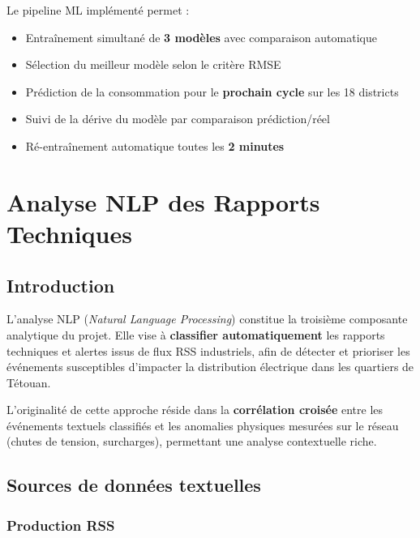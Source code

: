 \documentclass[12pt,a4paper]{report}
\begin{document}
\begin{resultbox}
Le pipeline ML impl\'{e}ment\'{e} permet :
\begin{itemize}[noitemsep]
  \item Entra\^{i}nement simultan\'{e} de \textbf{3 mod\`{e}les} avec comparaison automatique
  \item S\'{e}lection du meilleur mod\`{e}le selon le crit\`{e}re RMSE
  \item Pr\'{e}diction de la consommation pour le \textbf{prochain cycle} sur les 18 districts
  \item Suivi de la d\'{e}rive du mod\`{e}le par comparaison pr\'{e}diction/r\'{e}el
  \item R\'{e}-entra\^{i}nement automatique toutes les \textbf{2 minutes}
\end{itemize}
\end{resultbox}

\chapter{Analyse NLP des Rapports Techniques}
\label{chap:nlp}

\section{Introduction}

L'analyse NLP (\textit{Natural Language Processing}) constitue la troisi\`{e}me composante analytique du projet. Elle vise \`{a} \textbf{classifier automatiquement} les rapports techniques et alertes issus de flux RSS industriels, afin de d\'{e}tecter et prioriser les \'{e}v\'{e}nements susceptibles d'impacter la distribution \'{e}lectrique dans les quartiers de T\'{e}touan.

L'originalit\'{e} de cette approche r\'{e}side dans la \textbf{corr\'{e}lation crois\'{e}e} entre les \'{e}v\'{e}nements textuels classifi\'{e}s et les anomalies physiques mesur\'{e}es sur le r\'{e}seau (chutes de tension, surcharges), permettant une analyse contextuelle riche.

\section{Sources de donn\'{e}es textuelles}

\subsection{Production RSS}
\end{document}

